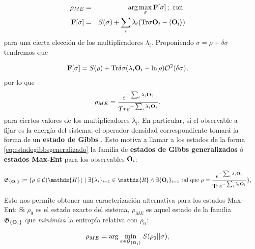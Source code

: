 \documentclass{report} %
\numberwithin{equation}{section}
\begin{document}
\begin{eqnarray}
\rho_{ME} &=& \arg\max_{\sigma} {\bf F}[\sigma]\,;\mbox{ con }\\
{\bf F}[\sigma]&=&S(\sigma)+\sum_i \lambda_i ({\Tr}\sigma{ \bf O}_i-\langle {\bf O}_i\rangle)
\label{max-ent_def1}
\end{eqnarray}
para una cierta elección de los multiplicadores $\lambda_i$. Proponiendo $\sigma=\rho+\delta \sigma$ tendremos que

\begin{equation*}
{\bf F}[\sigma]=S(\rho)+
{\Tr}\delta \sigma (\lambda_i {\bf O}_i-\ln \rho)
{\cal O}^2(\delta \sigma),
\end{equation*}
\noindent por lo que \begin{equation}
\rho_{ME}=\frac{e^{-\sum_i \lambda_i {\bf O}_i}}{{Tr}e^{-\sum_i \lambda_i {\bf O}_i}}.
\label{eq:estadogibbsgeneralizado}
\end{equation}
para ciertos valores de los multiplicadores $\lambda_i$. En particular, si el observable a fijar es la energía del sistema, el operador densidad correspondiente tomará la forma de un \textbf{estado de Gibbs} \cite{PATHRIA2011115}. Esto motiva a llamar a los estados de la forma \ref{eq:estadogibbsgeneralizado} la familia de \textbf{estados de Gibbs generalizados} ó  \textbf{estados Max-Ent} para los observables ${\bf O}_i$:

\begin{equation*}
\mathfrak{G}_{\{{\bf O}_i\}}:=\{\rho \in \mathcal{C}(\mathds{H})\textnormal{ | } \exists \{\lambda_i\}_{i=1} \in \mathds{R} \land \exists \{{\bf O}_i\}_{i=1}  \textnormal{ tal que }  \rho=\frac{e^{-\sum_i \lambda_i {\bf O}_i}}{\Tr e^{-\sum_i \lambda_i {\bf O}_i}}\},
\label{Gibbs_state}
\end{equation*}

Esto nos permite obtener una caracterización alternativa para los estados Max-Ent: Si $\rho_{0}$ es el estado exacto del sistema, $\rho_{ME}$ es aquel estado de la familia $\mathfrak{G}_{\{{\bf O}_i\}}$ que \emph{minimiza}
la entropía relativa con $\rho_0$:

\begin{equation}
\rho_{ME}= {\arg}\min_{\sigma \in {\cal G}_{\{{\bf O}_i\}}}S(\rho_0||\sigma),
\end{equation}
\end{document}
